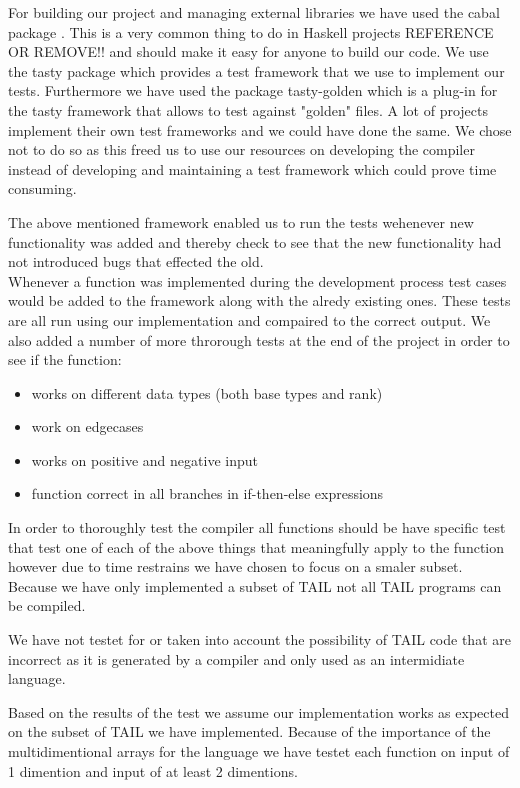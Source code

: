 \documentclass[11pt]{article}
\begin{document}
For building our project and managing external libraries we have used the cabal package \cite{cabal}. This is a very common thing to
do in Haskell projects REFERENCE OR REMOVE!! and should make it easy for anyone to build our code.
We use the tasty package \cite{tasty} which provides a test framework that we use to implement our tests. Furthermore we have used the
package tasty-golden \cite{tasty-golden} which is a plug-in for the tasty framework that allows to test against "golden" files.
A lot of projects implement their own test frameworks and we could have done the same.
We chose not to do so as this freed us to use our resources on developing the compiler instead of developing and maintaining a
test framework which could prove time consuming.

The above mentioned framework enabled us to run the tests wehenever new functionality was added and thereby check to see that the new functionality had not introduced bugs that effected the old. \\
Whenever a function was implemented during the development process test cases would be added to the framework along with the alredy existing ones. These tests are all run using our implementation and compaired to the correct output.
We also added a number of more throrough tests at the end of the project in order to see if the function:

\begin{itemize}
\item works on different data types (both base types and rank)
\item work on edgecases
\item works on positive and negative input
\item function correct in all branches in if-then-else expressions
\end{itemize}
In order to thoroughly test the compiler all functions should be have specific test that test one of each of the above things
that meaningfully apply to the function however due to time restrains we have chosen to focus on a smaler subset. \\

Because we have only implemented a subset of TAIL not all TAIL programs can be compiled. 


We have not testet for or taken into account the possibility of TAIL code that are incorrect as it is generated by a compiler and only used as an intermidiate language. 

Based on the results of the test we assume our implementation works as expected on the subset of TAIL we have implemented. 
Because of the importance of the multidimentional arrays for the language we have testet each function on input of 1 dimention and input of at least 2 dimentions. 
\end{document}
